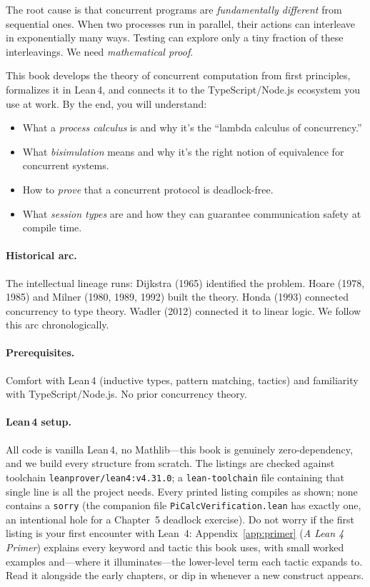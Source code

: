 \documentclass[11pt, a4paper, oneside]{book}
\newcommand{\lc}[1]{\texttt{#1}}
\newcounter{exercise}[chapter]
\begin{document}
The root cause is that concurrent programs are \emph{fundamentally different}
from sequential ones. When two processes run in parallel, their actions can
interleave in exponentially many ways. Testing can explore only a tiny
fraction of these interleavings. We need \emph{mathematical proof}.

This book develops the theory of concurrent computation from first principles,
formalizes it in Lean\,4, and connects it to the TypeScript/Node.js ecosystem
you use at work. By the end, you will understand:
\begin{itemize}[nosep]
\item What a \emph{process calculus} is and why it's the ``lambda calculus
      of concurrency.''
\item What \emph{bisimulation} means and why it's the right notion of
      equivalence for concurrent systems.
\item How to \emph{prove} that a concurrent protocol is deadlock-free.
\item What \emph{session types} are and how they can guarantee communication
      safety at compile time.
\end{itemize}

\paragraph{Historical arc.}
The intellectual lineage runs: Dijkstra (1965) identified the problem.
Hoare (1978, 1985) and Milner (1980, 1989, 1992) built the theory.
Honda (1993) connected concurrency to type theory. Wadler (2012) connected
it to linear logic. We follow this arc chronologically.

\paragraph{Prerequisites.}
Comfort with Lean\,4 (inductive types, pattern matching, tactics) and
familiarity with TypeScript/Node.js. No prior concurrency theory.

\paragraph{Lean\,4 setup.}
All code is vanilla Lean\,4, no Mathlib---this book is genuinely
zero-dependency, and we build every structure from scratch. The listings are
checked against toolchain \lc{leanprover/lean4:v4.31.0}; a \lc{lean-toolchain}
file containing that single line is all the project needs. Every printed
listing compiles as shown; none contains a \lc{sorry} (the companion file
\lc{PiCalcVerification.lean} has exactly one, an intentional hole for a
Chapter~5 deadlock exercise). Do not worry if the first listing
is your first encounter with Lean~4: Appendix~\ref{app:primer}
(\emph{A Lean 4 Primer}) explains every keyword and tactic this book uses,
with small worked examples and---where it illuminates---the lower-level term
each tactic expands to. Read it alongside the early chapters, or dip in
whenever a new construct appears.
\end{document}
